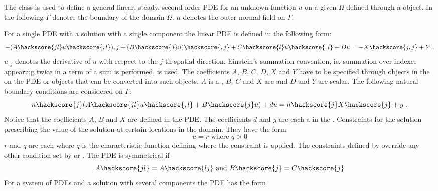 
The \LinearPDE class is used to define a general linear, steady, second order PDE
for an unknown function $u$ on a given $\Omega$ defined through a \Domain object.
In the following $\Gamma$ denotes the boundary of the domain $\Omega$. $n$ denotes
the outer normal field on $\Gamma$. 

For a single PDE with a solution with a single component the linear PDE is defined in the 
following form:
\begin{equation}\label{LINEARPDE.SINGLE.1}
-(A\hackscore{jl} u\hackscore{,l}){,j}+(B\hackscore{j} u)\hackscore{,j}+C\hackscore{l} u\hackscore{,l}+D u =-X\hackscore{j,j}+Y \; .
\end{equation}
$u_{,j}$ denotes the derivative of $u$ with respect to the $j$-th spatial direction. Einstein's summation convention, ie. summation over indexes appearing twice in a term of a sum is performed, is used. 
The coefficients $A$, $B$, $C$, $D$, $X$ and $Y$ have to be specified through \Data objects in the 
\Function on the PDE or objects that can be converted into such \Data objects. 
$A$ is a \RankTwo, $B$, $C$ and $X$ are \RankOne and $D$ and $Y$ are scalar. 
The following natural
boundary conditions are considered  on $\Gamma$:
\begin{equation}\label{LINEARPDE.SINGLE.2}
n\hackscore{j}(A\hackscore{jl} u\hackscore{,l}+B\hackscore{j} u)+d u=n\hackscore{j}X\hackscore{j} + y  \;.
\end{equation}
Notice that the coefficients $A$, $B$ and $X$ are defined in the PDE. The coefficients $d$ and $y$ are  
each a \Scalar in the \FunctionOnBoundary.  Constraints  for the solution prescribing the value of the 
solution at certain locations in the domain. They have the form
\begin{equation}\label{LINEARPDE.SINGLE.3}
u=r \mbox{ where } q>0
\end{equation}
$r$ and $q$ are each \Scalar where $q$ is the characteristic function
 defining where the constraint is applied.
The constraints defined by  override any other condition set by 
or . The PDE is symmetrical  if
\begin{equation}\label{LINEARPDE.SINGLE.4}
A\hackscore{jl}=A\hackscore{lj} \mbox{ and } B\hackscore{j}=C\hackscore{j}
\end{equation}
For a system of PDEs and a solution with several components the PDE has the form
